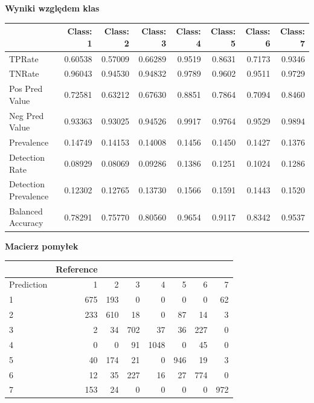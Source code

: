 \documentclass[11pt]{article} %
\begin{document}
\begin{samepage}
\textbf{Wyniki względem klas}

\begin{center}
\begin{tabular}{| l | r | r | r | r | r | r | r |}
\hline
&Class: 1 &Class: 2 &Class: 3 &Class: 4 &Class: 5 &Class: 6 &Class: 7 \\ \hline
TPRate &           0.60538 &  0.57009 &  0.66289 &   0.9519 &   0.8631 &   0.7173 &   0.9346 \\
TNRate &           0.96043 &  0.94530 &  0.94832 &   0.9789 &   0.9602 &   0.9511 &   0.9729 \\
Pos Pred Value &        0.72581 &  0.63212 &  0.67630 &   0.8851 &   0.7864 &   0.7094 &   0.8460 \\
Neg Pred Value &        0.93363 &  0.93025 &  0.94526 &   0.9917 &   0.9764 &   0.9529 &   0.9894 \\
Prevalence &            0.14749 &  0.14153 &  0.14008 &   0.1456 &   0.1450 &   0.1427 &   0.1376 \\
Detection Rate &        0.08929 &  0.08069 &  0.09286 &   0.1386 &   0.1251 &   0.1024 &   0.1286 \\
Detection Prevalence &  0.12302 &  0.12765 &  0.13730 &   0.1566 &   0.1591 &   0.1443 &   0.1520 \\
Balanced Accuracy &     0.78291 &  0.75770 &  0.80560 &   0.9654 &   0.9117 &   0.8342 &   0.9537 \\ \hline
\end{tabular}
\end{center}
\end{samepage}
 
\begin{samepage}
\textbf{Macierz pomyłek}

\begin{center}
\begin{tabular}{| l | r | r | r | r | r | r | r |}
\hline
&          Reference \\ \hline
Prediction    &1    &2    &3    &4    &5&    6    &7 \\ \hline
         1 & 675 & 193 &   0    &0 &   0 &   0 &  62\\
         2  &233 & 610  & 18 &   0  & 87 &  14   & 3\\
         3    &2   &34 & 702 &  37  & 36 & 227  &  0\\
         4    &0   & 0  & 91& 1048   & 0  & 45  &  0\\
         5   &40  &174 &  21  &  0 & 946  & 19 &   3\\
         6   &12  & 35 & 227  & 16  & 27 & 774 &   0\\
         7  &153 &  24  &  0 &   0  &  0 &   0 & 972\\ \hline
\end{tabular}
\end{center}
\end{samepage}
\end{document}

